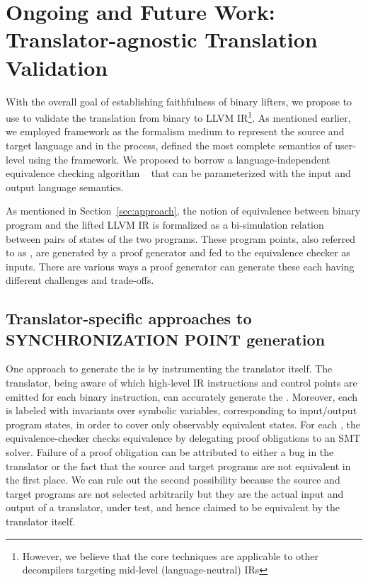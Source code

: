 \chapter{Ongoing and Future Work: Translator-agnostic Translation
  Validation}\label{sec:future}

With the overall goal of  establishing faithfulness of binary lifters, we
propose to use \tv to validate the translation from binary to LLVM IR\footnote{However, we believe that the core techniques are
    applicable to other decompilers targeting mid-level (language-neutral) IRs}. As
mentioned earlier, we employed \K framework as the formalism medium to
represent the source and target language and in the process, defined the most
complete semantics of user-level \ISA using the framework. We proposed to
borrow a language-independent equivalence checking algorithm
~\cite{TheoSAS19} that can be parameterized with the input and output
language semantics. 

As mentioned in Section~\ref{sec:approach}, the notion of equivalence between
binary program and the lifted LLVM IR is formalized as a bi-simulation
relation~\cite{Sangiorgi:2011} between pairs of states of the two programs.
These program points, also referred to as \syncps, are generated by a proof generator and fed to the equivalence
checker as inputs. There are various ways a proof generator can generate these
\syncps each having different challenges and trade-offs.

\section{Translator-specific approaches to SYNCHRONIZATION POINT
  generation}\label{sec:TS} One approach to generate the \syncps is by
  instrumenting the translator itself. 
%
The translator, being aware of which high-level IR instructions and control
points are emitted for each binary instruction, can accurately generate the
\syncps. Moreover, each \syncp is labeled with invariants over symbolic
variables, corresponding to input/output program states, in order to cover only
observably equivalent states. For each \syncp, the equivalence-checker checks
equivalence by delegating proof obligations to an SMT solver. Failure of a
proof obligation can be attributed to either a bug in the translator or  the
fact that the source and target programs are not equivalent in the first place.
We can rule out the second possibility because the source and target programs
are not selected arbitrarily but they are the actual input and output of a
translator, under test, and hence claimed to be equivalent by the translator
itself.

